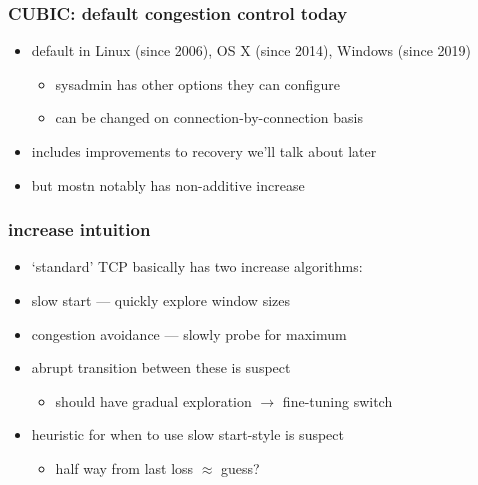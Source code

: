 \begin{frame}
\frametitle{CUBIC: default congestion control today}
    \begin{itemize}
    \item default in Linux (since 2006), OS X (since 2014), Windows (since 2019)
        \begin{itemize}
        \item sysadmin has other options they can configure
        \item can be changed on connection-by-connection basis
        \end{itemize}
    \item includes improvements to recovery we'll talk about later
    \item but mostn notably has non-additive increase
    \end{itemize}
\end{frame}

\begin{frame}
    \frametitle{increase intuition}
    \begin{itemize}
        \item `standard' TCP basically has two increase algorithms:
        \item slow start --- quickly explore window sizes
        \item congestion avoidance --- slowly probe for maximum
        \vspace{.5cm}
        \item abrupt transition between these is suspect
            \begin{itemize}
            \item should have gradual exploration $\rightarrow$ fine-tuning switch
            \end{itemize}
        \item heuristic for when to use slow start-style is suspect
            \begin{itemize}
            \item half way from last loss $\approx$ guess?
            \end{itemize}
    \end{itemize}
\end{frame}

